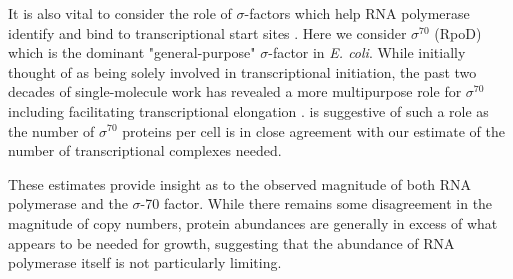It is also vital to consider the role of $\sigma$-factors which
help RNA polymerase identify and bind to transcriptional start sites
\citep{browning2016}. Here we consider $\sigma^{70}$ (RpoD) which is the
dominant "general-purpose" $\sigma$-factor in \textit{E. coli}. While initially
thought of as being solely involved in transcriptional initiation, the past two
decades of single-molecule work has revealed a more multipurpose role for
$\sigma^{70}$ including facilitating transcriptional elongation
\citep{kapanidis2005, goldman2015, perdue2011,mooney2003,mooney2005}.
 is suggestive of such a role as the number of
$\sigma^{70}$ proteins per cell is in close agreement with our estimate of the
number of transcriptional complexes needed.

These estimates provide insight as to the observed magnitude of both RNA
polymerase and the $\sigma$-70 factor.
While there remains some disagreement in the magnitude of copy numbers, protein
abundances are generally in excess of what appears to be needed for growth, suggesting
that the abundance of RNA polymerase itself is not particularly limiting.



